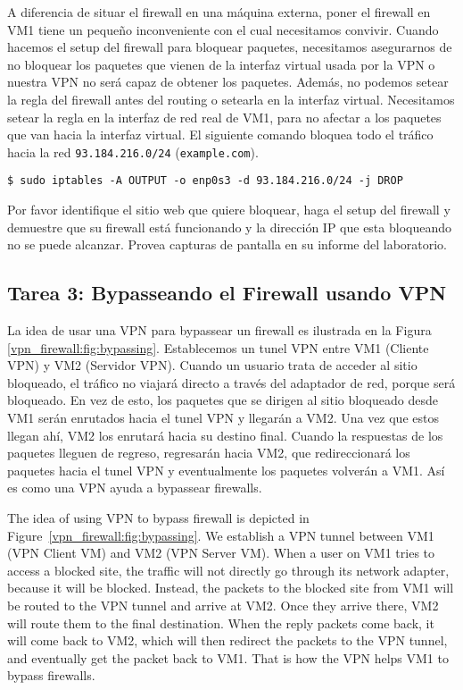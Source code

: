 A diferencia de situar el firewall en una máquina externa, poner el firewall en VM1 tiene un pequeño inconveniente con el cual necesitamos convivir. Cuando hacemos el setup del firewall para bloquear paquetes, necesitamos asegurarnos de no bloquear los paquetes que vienen de la interfaz virtual usada por la VPN o nuestra VPN no será capaz de obtener los paquetes. Además, no podemos setear la regla del firewall antes del routing o setearla  en la interfaz virtual. Necesitamos setear la regla en la interfaz de red real de VM1, para no afectar a los paquetes que van hacia la interfaz virtual. El siguiente comando bloquea todo el tráfico hacia la red \texttt{93.184.216.0/24}  (\texttt{example.com}).


\begin{lstlisting}
$ sudo iptables -A OUTPUT -o enp0s3 -d 93.184.216.0/24 -j DROP
\end{lstlisting}

Por favor identifique el sitio web que quiere bloquear, haga el setup del firewall y demuestre que su firewall está funcionando y la dirección IP que esta bloqueando no se puede alcanzar. Provea capturas de pantalla en su informe del laboratorio.

\subsection{Tarea 3: Bypasseando el Firewall usando VPN}

La idea de usar una VPN para bypassear un firewall es ilustrada en la Figura \ref{vpn_firewall:fig:bypassing}. 
Establecemos un tunel VPN entre VM1 (Cliente VPN) y VM2 (Servidor VPN).
Cuando un usuario trata de acceder al sitio bloqueado, el tráfico no viajará directo a través del adaptador de red, porque será bloqueado. En vez de esto, los paquetes que se dirigen al sitio bloqueado desde VM1 serán enrutados hacia el tunel VPN y llegarán a VM2. Una vez que estos llegan ahí, VM2 los enrutará hacia su destino final.
Cuando la respuestas de los paquetes lleguen de regreso, regresarán hacia VM2, que redireccionará los paquetes hacia el tunel VPN y eventualmente los paquetes volverán a VM1. Así es como una VPN ayuda a bypassear firewalls.

The idea of using VPN to bypass firewall is depicted in 
Figure~\ref{vpn_firewall:fig:bypassing}. 
We establish a VPN tunnel between VM1 (VPN Client VM) 
and VM2 (VPN Server VM). 
When a user on VM1 tries to access a blocked site, the traffic will not directly 
go through its network adapter, because it will be blocked. Instead, the 
packets to the blocked site from VM1 will be routed to the VPN tunnel and arrive at VM2. Once
they arrive there, VM2 will route them to the final destination. 
When the reply packets come back, it will come back to VM2, which will then redirect the
packets to the VPN tunnel, and eventually get the packet back to VM1. That is how the VPN helps
VM1 to bypass firewalls. 

